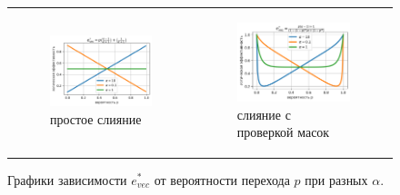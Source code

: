 \documentclass[a4paper,14pt]{extarticle}                     %
\theoremstyle{plain}                                         %
\begin{document}
\begin{figure}[!ht]
\centering
\begin{tabular}{ll}
\begin{subfigure}{0.45\textwidth}\centering\includegraphics[width=0.85\columnwidth]{./fig/vec_ifconv_nocheck_chart.png}\caption{простое слияние}\end{subfigure} &
\begin{subfigure}{0.45\textwidth}\centering\includegraphics[width=0.85\columnwidth]{./fig/vec_ifconv_check_chart.png}\caption{слияние с проверкой масок}\end{subfigure}
\end{tabular}
\singlespacing
\caption{Графики зависимости $e_{vec}^{*}$ от вероятности перехода $p$ при разных $\alpha$.}
\label{fig:vec_charts_nocheck_check}
\end{figure}
\end{document}
